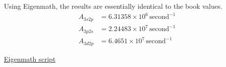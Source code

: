 Using Eigenmath,
the results are essentially identical to the book values.
\begin{align*}
A_{3s2p}&=6.31358\times10^6\,\text{second}^{-1}
\\
A_{3p2s}&=2.24483\times10^7\,\text{second}^{-1}
\\
A_{3d2p}&=6.4651\times10^7\,\text{second}^{-1}
\end{align*}

\href{https://georgeweigt.github.io/examples/hydrogen-alpha-line-demo.html}{Eigenmath script}


